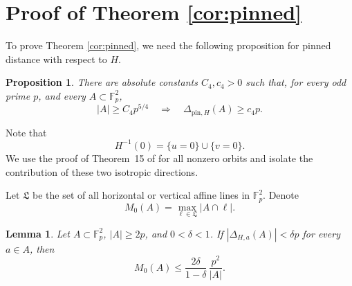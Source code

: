 \documentclass[11pt]{article}
\newtheorem{lemma}[theorem]{Lemma}
\newtheorem{proposition}[theorem]{Proposition}
\newcommand{\F}{\mathbb F}
\def\boqing#1{\noindent
\textcolor{magenta}
{\textsc{(Boqing:}
\textsf{#1})}}
\begin{document}
\section{Proof of Theorem \ref{cor:pinned}}

To prove Theorem \ref{cor:pinned}, we need the following proposition for pinned distance with respect to $H$.

\begin{proposition}
\label{prop:prime-planar-both-2}
There are absolute constants $C_4,c_4>0$ such that, for every odd
prime $p$, and every $A\subset\F_p^2$,
\begin{equation} \label{eq:prime-planar-both}
|A|\ge C_4 p^{5/4} \quad\Longrightarrow\quad \Delta_{\mathrm{pin},H}(A)\ge c_4 p.
\end{equation}
\end{proposition}








Note that
\[
 H^{-1}(0)=\{u=0\}\cup\{v=0\}.
\]
We use the proof of Theorem~15 of \cite{MPPRS} for all nonzero
orbits and isolate the contribution of these two isotropic
directions.

Let $\mathfrak L$ be the set of all horizontal or vertical affine lines in $\F_p^2$. Denote
\[
 M_0(A)=\max_{\ell\in \mathfrak L}|A\cap\ell|.
\]

\begin{lemma}
\label{lem:split-fibre-pruning}
Let $A\subset\F_p^2$, $|A|\ge2p$, and $0<\delta<1$.  If $|\Delta_{H,a}(A)|<\delta p$ for every $a\in A$, then
\[
M_0(A)\le \frac{2\delta}{1-\delta}\,\frac{p^2}{|A|}.
\]
\end{lemma}
\end{document}
